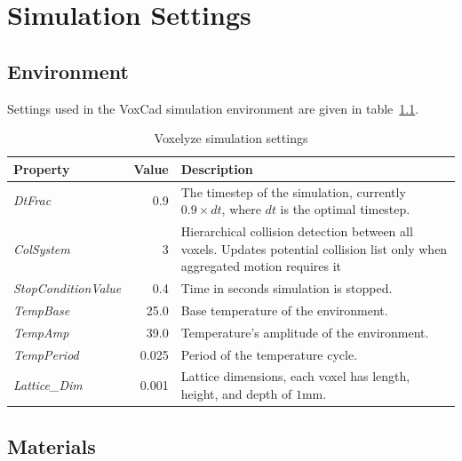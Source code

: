 \chapter{Simulation Settings} %
\label{SimulationSettings} %



\section{Environment}
Settings used in the VoxCad simulation environment are given in table~\ref{VoxelyzeSimulationSettings}.

\begin{table}[ht!]
\centering
\caption{Voxelyze simulation settings}
\label{VoxelyzeSimulationSettings}
    \begin{tabular}{l r p{9cm}}
    \toprule
    \textbf{Property} & \textbf{Value} & \textbf{Description}\\
    \midrule
    \emph{DtFrac} & 0.9 & The timestep of the simulation, currently $0.9 \times dt$, where $dt$ is the optimal timestep.\\
    \emph{ColSystem}        & 3 & Hierarchical collision detection between all voxels. Updates potential collision list only when aggregated motion requires it\footnote.\\
    \emph{StopConditionValue} & 0.4 & Time in seconds simulation is stopped.\\
    \emph{TempBase} & 25.0 & Base temperature of the environment.\\
    \emph{TempAmp} & 39.0 & Temperature's amplitude of the environment.\\
    \emph{TempPeriod} & 0.025 & Period of the temperature cycle.\\
    \emph{Lattice\_Dim} & 0.001 & Lattice dimensions, each voxel has length, height, and depth of $1$mm.\\
    \bottomrule
    \end{tabular}
\end{table}




\section{Materials}

